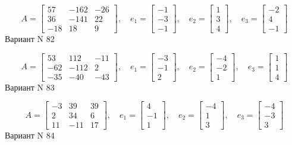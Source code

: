\documentclass[11pt]{report}
\begin{document}
$$A = \left[\begin{matrix}57 & -162 & -26\\36 & -141 & 22\\-18 & 18 & 9\end{matrix}\right],\quad e_1 = \left[\begin{matrix}-1\\-3\\-1\end{matrix}\right],\quad e_2 = \left[\begin{matrix}1\\3\\4\end{matrix}\right],\quad e_3 = \left[\begin{matrix}-2\\4\\-1\end{matrix}\right]$$Вариант N 82

$$A = \left[\begin{matrix}53 & 112 & -11\\-62 & -112 & 2\\-35 & -40 & -43\end{matrix}\right],\quad e_1 = \left[\begin{matrix}-3\\-1\\2\end{matrix}\right],\quad e_2 = \left[\begin{matrix}-4\\-2\\1\end{matrix}\right],\quad e_3 = \left[\begin{matrix}1\\1\\4\end{matrix}\right]$$Вариант N 83

$$A = \left[\begin{matrix}-3 & 39 & 39\\2 & 34 & 6\\11 & -11 & 17\end{matrix}\right],\quad e_1 = \left[\begin{matrix}4\\-1\\1\end{matrix}\right],\quad e_2 = \left[\begin{matrix}-4\\1\\3\end{matrix}\right],\quad e_3 = \left[\begin{matrix}-4\\-3\\3\end{matrix}\right]$$Вариант N 84
\end{document}
